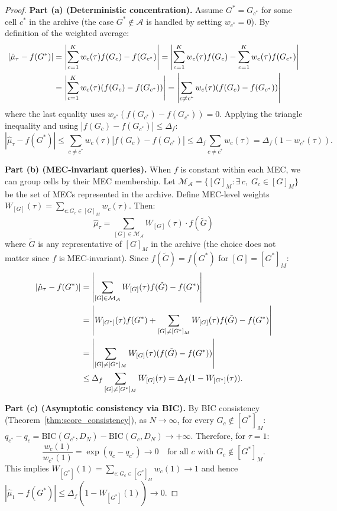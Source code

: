\documentclass{article}
\theoremstyle{definition}
\theoremstyle{plain}
\theoremstyle{remark}
\begin{document}
\begin{proof}
\textbf{Part (a) (Deterministic concentration).}
Assume $G^* = G_{c^*}$ for some cell $c^*$ in the archive (the case $G^* \notin \mathcal{A}$
is handled by setting $w_{c^*} = 0$). By definition of the weighted average:
\begin{align}
  |\hat{\mu}_\tau - f(G^*)| &= \left|\sum_{c=1}^K w_c(\tau) f(G_c) - f(G_{c^*})\right|
  = \left|\sum_{c=1}^K w_c(\tau) f(G_c) - \sum_{c=1}^K w_c(\tau) f(G_{c^*})\right| \\
  &= \left|\sum_{c=1}^K w_c(\tau) (f(G_c) - f(G_{c^*}))\right|
  = \left|\sum_{c \neq c^*} w_c(\tau) (f(G_c) - f(G_{c^*}))\right| \notag
\end{align}
where the last equality uses $w_{c^*}(f(G_{c^*}) - f(G_{c^*})) = 0$. Applying the
triangle inequality and using $|f(G_c) - f(G_{c^*})| \leq \Delta_f$:
\begin{equation}
  |\hat{\mu}_\tau - f(G^*)| \leq \sum_{c \neq c^*} w_c(\tau) |f(G_c) - f(G_{c^*})|
  \leq \Delta_f \sum_{c \neq c^*} w_c(\tau) = \Delta_f (1 - w_{c^*}(\tau)).
\end{equation}

\textbf{Part (b) (MEC-invariant queries).}
When $f$ is constant within each MEC, we can group cells by their MEC membership. Let
$\mathcal{M}_\mathcal{A} = \{[G]_M : \exists\, c,\; G_c \in [G]_M\}$ be the set of MECs
represented in the archive. Define MEC-level weights
$W_{[G]}(\tau) = \sum_{c : G_c \in [G]_M} w_c(\tau)$. Then:
\begin{equation}
  \hat{\mu}_\tau = \sum_{[G] \in \mathcal{M}_\mathcal{A}} W_{[G]}(\tau) \cdot f(\tilde{G})
\end{equation}
where $\tilde{G}$ is any representative of $[G]_M$ in the archive (the choice does not
matter since $f$ is MEC-invariant). Since $f(\tilde{G}) = f(G^*)$ for
$[G] = [G^*]_M$:
\begin{align}
  |\hat{\mu}_\tau - f(G^*)| &= \left|\sum_{[G] \in \mathcal{M}_\mathcal{A}}
  W_{[G]}(\tau) f(\tilde{G}) - f(G^*)\right| \\
  &= \left|W_{[G^*]}(\tau) f(G^*) + \sum_{[G] \neq [G^*]_M} W_{[G]}(\tau) f(\tilde{G})
  - f(G^*)\right| \notag \\
  &= \left|\sum_{[G] \neq [G^*]_M} W_{[G]}(\tau) (f(\tilde{G}) - f(G^*))\right| \notag \\
  &\leq \Delta_f \sum_{[G] \neq [G^*]_M} W_{[G]}(\tau) = \Delta_f(1 - W_{[G^*]}(\tau)). \notag
\end{align}

\textbf{Part (c) (Asymptotic consistency via BIC).}
By BIC consistency (Theorem~\ref{thm:score_consistency}), as $N \to \infty$, for every
$G_c \notin [G^*]_M$: $q_{c^*} - q_c = \mathrm{BIC}(G_{c^*}, D_N) - \mathrm{BIC}(G_c, D_N)
\to +\infty$. Therefore, for $\tau = 1$:
\begin{equation}
  \frac{w_c(1)}{w_{c^*}(1)} = \exp(q_c - q_{c^*}) \to 0
  \quad \text{for all } c \text{ with } G_c \notin [G^*]_M.
\end{equation}
This implies $W_{[G^*]}(1) = \sum_{c : G_c \in [G^*]_M} w_c(1) \to 1$ and hence
$|\hat{\mu}_1 - f(G^*)| \leq \Delta_f(1 - W_{[G^*]}(1)) \to 0$.


\end{proof}
\end{document}
